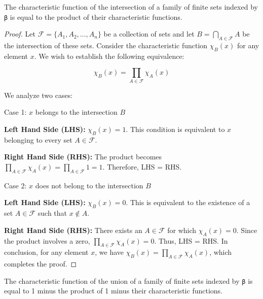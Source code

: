 \begin{lemma}\label{char_fun_FinInter}
  \leanok
  The characteristic function of the intersection of a family of finite sets indexed by \verb|β| is equal to the product of their characteristic functions.
\end{lemma}

\begin{proof}
  \leanok
  Let $\mathcal{F} = \{A_1, A_2, \ldots, A_n\}$ be a collection of sets and let $B = \bigcap_{A \in \mathcal{F}} A$ be the intersection of these sets. Consider the characteristic function $\chi_B(x)$ for any element $x$. We wish to establish the following equivalence:

  \begin{equation*}
  \chi_B(x) = \prod_{A \in \mathcal{F}} \chi_A(x)
  \end{equation*}

  We analyze two cases:

  Case 1: $x$ belongs to the intersection $B$

  \textbf{Left Hand Side (LHS):} $\chi_B(x) = 1$. This condition is equivalent to $x$ belonging to every set $A \in \mathcal{F}$.

  \textbf{Right Hand Side (RHS):} The product becomes $\prod_{A \in \mathcal{F}} \chi_A(x) = \prod_{A \in \mathcal{F}} 1 = 1$. Therefore, LHS = RHS.

  Case 2: $x$ does not belong to the intersection $B$

  \textbf{Left Hand Side (LHS):} $\chi_B(x) = 0$. This is equivalent to the existence of a set $A \in \mathcal{F}$ such that $x \not\in A$.

  \textbf{Right Hand Side (RHS):} There exists an $A \in \mathcal{F}$ for which $\chi_A(x) = 0$. Since the product involves a zero, $\prod_{A \in \mathcal{F}} \chi_A(x) = 0$. Thus, LHS = RHS.
  In conclusion, for any element $x$, we have $\chi_B(x) = \prod_{A \in \mathcal{F}} \chi_A(x)$, which completes the proof.

\end{proof}

\begin{lemma}\label{char_fun_FinUnion}
  The characteristic function of the union of a family of finite sets indexed by \verb|β| is equal to 1 minus the product of 1 minus their characteristic functions.
\end{lemma}

